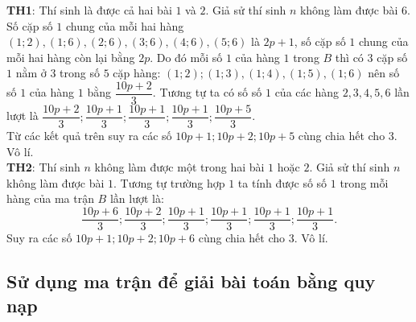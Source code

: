 \begin{bt}[IMO 2005]
{		\textbf{TH1}: Thí sinh là được cả hai bài $1$ và $2$. Giả sử thí sinh $n$ không làm được bài $6$. Số cặp số $1$ chung của mỗi hai hàng $(1;2), (1;6), (2;6),(3;6),(4;6),(5;6)$ là $2p+1$, số cặp số $1$ chung của mỗi hai hàng còn lại bằng $2p$. Do đó mỗi số $1$ của hàng $1$ trong $B$ thì có $3$ cặp số $1$ nằm ở $3$ trong số $5$ cặp hàng: $(1;2);(1;3), (1;4),(1;5),(1;6)$ nên số số $1$ của hàng $1$ bằng $\dfrac{10p+2}{3}$. Tương tự ta có số số $1$ của các hàng $2,3,4,5,6$ lần lượt là $\dfrac{10p+2}{3};\dfrac{10p+1}{3};\dfrac{10p+1}{3};\dfrac{10p+1}{3};\dfrac{10p+5}{3}$. \\
		Từ các kết quả trên suy ra các số $10p+1;10p+2;10p+5$ cùng chia hết cho $3$. Vô lí. \\
		\textbf{TH2}: Thí sinh $n$ không làm được một trong hai bài $1$ hoặc $2$. Giả sử thí sinh $n$ không làm được bài $1$. Tương tự trường hợp $1$ ta tính được số số $1$ trong mỗi hàng của ma trận $B$ lần lượt là: $$\dfrac{10p+6}{3};\dfrac{10p+2}{3};\dfrac{10p+1}{3};\dfrac{10p+1}{3};\dfrac{10p+1}{3};\dfrac{10p+1}{3}.$$
		Suy ra các số $10p+1; 10p+2; 10p+6$ cùng chia hết cho $3$. Vô lí. 
		
	}
\end{bt}


\subsection{Sử dụng ma trận để giải bài toán bằng quy nạp}


